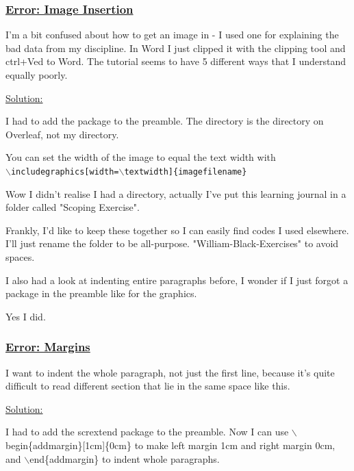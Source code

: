 \documentclass[12pt]{article}
\begin{document}
\subsubsection{\texorpdfstring{\underline{Error: Image Insertion}}{}}\label{error:er8}
\begin{addmargin}[1cm]{0cm}
I'm a bit confused about how to get an image in - I used one for explaining the bad data from my discipline. In Word I just clipped it with the clipping tool and ctrl+Ved to Word. The tutorial seems to have 5 different ways that I understand equally poorly.

\underline{Solution:}

I had to add the package to the preamble. The directory is the directory on Overleaf, not my directory.

You can set the width of the image to equal the text width with 
\\\texttt{$\backslash$includegraphics[width=$\backslash$textwidth]\{imagefilename\}}
\end{addmargin}

\vspace{0.5em}
Wow I didn't realise I had a directory, actually I've put this learning journal in a folder called "Scoping Exercise".

Frankly, I'd like to keep these together so I can easily find codes I used elsewhere. I'll just rename the folder to be all-purpose. "William-Black-Exercises" to avoid spaces.

I also had a look at indenting entire paragraphs before, I wonder if I just forgot a package in the preamble like for the graphics.

Yes I did.

\subsubsection{\texorpdfstring{\underline{Error: Margins}}{}}\label{error:er9}
\begin{addmargin}[1cm]{0cm}
I want to indent the whole paragraph, not just the first line, because it's quite difficult to read different section that lie in the same space like this.

\underline{Solution:}

I had to add the scrextend package to the preamble. Now I can use $\backslash$begin\{addmargin\}[1cm]\{0cm\} to make left margin 1cm and right margin 0cm, and $\backslash$end\{addmargin\} to indent whole paragraphs.

\end{addmargin}
\end{document}
